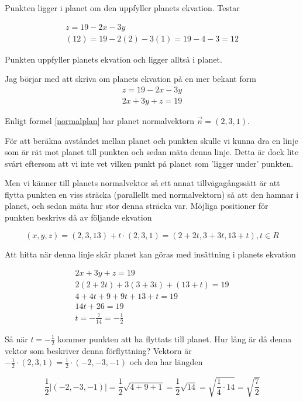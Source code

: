 \documentclass[../../main.tex]{subfiles}
\begin{document}
\begin{solution}{18}

Punkten ligger i planet om den uppfyller planets ekvation. Testar

\begin{align*}
z = 19 - 2x - 3y\\
(12) = 19 - 2(2) -3(1) = 19 - 4 - 3 = 12
\end{align*}

Punkten uppfyller planets ekvation och ligger alltså i planet.

Jag börjar med att skriva om planets ekvation på en mer bekant form
\begin{align*}
z = 19 - 2x - 3y\\
2x + 3y + z = 19
\end{align*}

Enligt formel \ref{normalplan} har planet normalvektorn $\Vec{n} = (2, 3, 1)$.

För att beräkna avståndet mellan planet och punkten skulle vi kunna dra en linje som är rät mot planet till punkten och sedan mäta denna linje. Detta är dock lite svårt eftersom att vi inte vet vilken punkt på planet som 'ligger under' punkten. 

Men vi känner till planets normalvektor så ett annat tillvägagångssätt är att flytta punkten en viss sträcka (parallellt med normalvektorn) så att den hamnar i planet, och sedan mäta hur stor denna sträcka var. Möjliga positioner för punkten beskrivs då av följande ekvation

\[(x, y, z) = (2, 3, 13) + t \cdot (2, 3, 1) = (2 + 2t, 3 + 3t, 13 + t), t \in R\]

Att hitta när denna linje skär planet kan göras med insättning i planets ekvation

\begin{align*}
2x+3y+z=19\\
2(2 + 2t) + 3(3 + 3t) + (13+t) = 19\\
4 + 4t + 9 + 9t + 13 + t = 19\\
14t + 26 = 19\\
t = -\frac{7}{14} = -\frac{1}{2}
\end{align*}

Så när $t=-\frac{1}{2}$ kommer punkten att ha flyttats till planet. Hur lång är då denna vektor som beskriver denna förflyttning? Vektorn är $-\frac{1}{2}\cdot (2, 3, 1) = \frac{1}{2}\cdot(-2, -3, -1)$ och den har längden

$$\frac{1}{2}|(-2, -3, -1)| = \frac{1}{2}\sqrt{4+9+1} = \frac{1}{2}\sqrt{14} = \sqrt{\frac{1}{4}\cdot 14} = \sqrt{\frac{7}{2}}$$


\end{solution}
\end{document}
